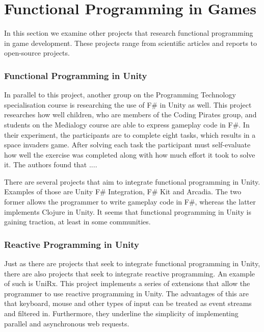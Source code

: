\section{Functional Programming in Games}
In this section we examine other projects that research functional programming in game development. These projects range from scientific articles and reports to open-source projects.

\subsubsection{Functional Programming in Unity}
In parallel to this project, another group on the Programming Technology specialisation course is researching the use of F\# in Unity as well. This project researches how well children, who are members of the Coding Pirates group, and students on the Medialogy course are able to express gameplay code in F\#. In their experiment, the participants are to complete eight tasks, which results in a space invaders game. After solving each task the participant must self-evaluate how well the exercise was completed along with how much effort it took to solve it. The authors found that ...\needcite. 

There are several projects that aim to integrate functional programming in Unity. Examples of those are Unity F\# Integration\cite{fsharp2019plugin}, F\# Kit\cite{fsharp:kit} and Arcadia\cite{arcadia:github}. The two former allows the programmer to write gameplay code in F\#, whereas the latter implements Clojure in Unity. It seems that functional programming in Unity is gaining traction, at least in some communities.

\subsubsection{Reactive Programming in Unity}
Just as there are projects that seek to integrate functional programming in Unity, there are also projects that seek to integrate reactive programming. An example of such is UniRx\cite{unirx}. This project implements a series of extensions that allow the programmer to use reactive programming in Unity. The advantages of this are that keyboard, mouse and other types of input can be treated as event streams and filtered in. Furthermore, they underline the simplicity of implementing parallel and asynchronous web requests\cite{unirx:github}.

